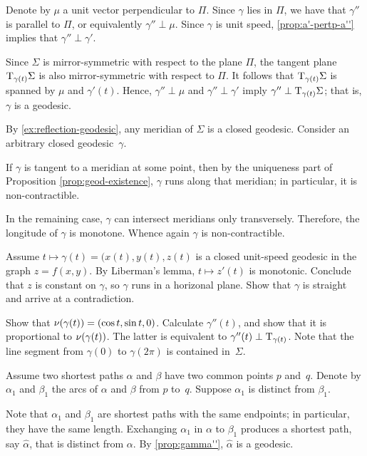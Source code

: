 \begin{multicols}{2}
Denote by $\mu$ a unit vector perpendicular to $\Pi$.
Since $\gamma$ lies in $\Pi$, we have that $\gamma''$ is parallel to $\Pi$, or equivalently $\gamma''\perp \mu$.
Since $\gamma$ is unit speed, \ref{prop:a'-pertp-a''} implies that $\gamma''\perp\gamma'$.

Since $\Sigma$ is mirror-symmetric with respect to the plane $\Pi$,
the tangent plane $\mathrm{T}_{\gamma(t)}\Sigma$ is also mirror-symmetric with respect to $\Pi$.
It follows that $\mathrm{T}_{\gamma(t)}\Sigma$ is spanned by $\mu$ and $\gamma'(t)$.
Hence, $\gamma''\perp \mu$ and $\gamma''\perp\gamma'$ imply $\gamma''\perp\mathrm{T}_{\gamma(t)}\Sigma$;
that is, $\gamma$ is a geodesic.



By \ref{ex:reflection-geodesic}, any meridian of $\Sigma$ is a closed geodesic.
Consider an arbitrary closed geodesic~$\gamma$.

If $\gamma$ is tangent to a meridian at some point, then by the uniqueness part of Proposition \ref{prop:geod-existence}, $\gamma$ runs along that meridian;
in particular, it is non-contractible.

In the remaining case, $\gamma$ can intersect meridians only transversely.
Therefore, the longitude of $\gamma$ is monotone.
Whence again $\gamma$ is non-contractible.

 Assume $t\mapsto \gamma(t)=(x(t),y(t),z(t)$ is a closed unit-speed geodesic in the graph $z=f(x,y)$.
By Liberman's lemma, $t\mapsto z'(t)$ is monotonic.
Conclude that $z$ is constant on $\gamma$, so $\gamma$ runs in a horizonal plane.
Show that $\gamma$ is straight and arrive at a contradiction.

Show that $\nu(\gamma(t))=(\cos t,\sin t, 0)$.
Calculate $\gamma''(t)$, and show that it is proportional to $\nu(\gamma(t))$.
The latter is equivalent to $\gamma''(t)\perp\mathrm{T}_{\gamma(t)}$. 
Note that the line segment from $\gamma (0) $ to $\gamma (2 \pi) $ is contained in~$\Sigma$.



Assume two shortest paths $\alpha$ and $\beta$ have two common points $p$ and~$q$.
Denote by $\alpha_1$ and $\beta_1$ the arcs of $\alpha$ and $\beta$ from $p$ to~$q$.
Suppose $\alpha_1$ is distinct from $\beta_1$.

Note that $\alpha_1$ and $\beta_1$ are shortest paths with the same endpoints;
in particular, they have the same length.
Exchanging $\alpha_1$ in $\alpha$ to $\beta_1$ produces a shortest path, say $\hat\alpha$, that is distinct from $\alpha$.
By \ref{prop:gamma''}, $\hat\alpha$ is a geodesic.


\end{multicols}
